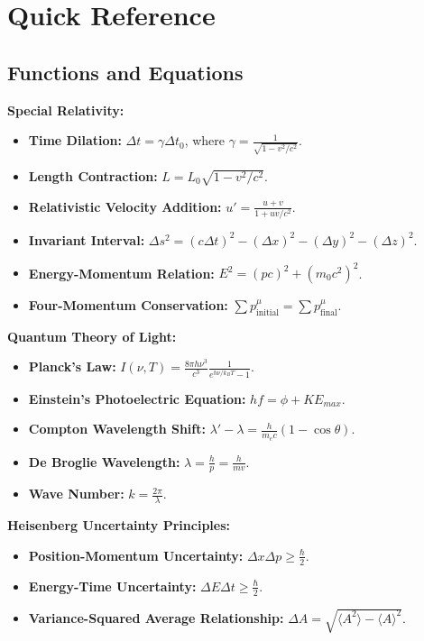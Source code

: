\documentclass{article}
\newcommand{\tipbox}[1]{\begin{tcolorbox}[colback=green!10] #1 \end{tcolorbox}}
\begin{document}
\newpage

\section{Quick Reference}

\subsection{Functions and Equations}
\begin{itemize}
    \tipbox{
    \textbf{Special Relativity:}
    \begin{itemize}
        \item \textbf{Time Dilation:} \(\Delta t = \gamma \Delta t_0\), where \(\gamma = \frac{1}{\sqrt{1 - v^2/c^2}}\).
        \item \textbf{Length Contraction:} \(L = L_0 \sqrt{1 - v^2/c^2}\).
        \item \textbf{Relativistic Velocity Addition:} \(u' = \frac{u + v}{1 + uv/c^2}\).
        \item \textbf{Invariant Interval:} \(\Delta s^2 = (c\Delta t)^2 - (\Delta x)^2 - (\Delta y)^2 - (\Delta z)^2\).
        \item \textbf{Energy-Momentum Relation:} \(E^2 = (pc)^2 + (m_0c^2)^2\).
        \item \textbf{Four-Momentum Conservation:} \(\sum p^\mu_{\text{initial}} = \sum p^\mu_{\text{final}}\).
    \end{itemize}
    }
    
    \tipbox{
    \textbf{Quantum Theory of Light:}
    \begin{itemize}
        \item \textbf{Planck's Law:} \(I(\nu, T) = \frac{8\pi h\nu^3}{c^3}\frac{1}{e^{h\nu/k_BT} - 1}\).
        \item \textbf{Einstein's Photoelectric Equation:} \(hf = \phi + KE_{max}\).
        \item \textbf{Compton Wavelength Shift:} \(\lambda' - \lambda = \frac{h}{m_ec}(1 - \cos\theta)\).
        \item \textbf{De Broglie Wavelength:} \(\lambda = \frac{h}{p} = \frac{h}{mv}\).
        \item \textbf{Wave Number:} \(k = \frac{2\pi}{\lambda}\).
    \end{itemize}
    }
    
    \tipbox{
    \textbf{Heisenberg Uncertainty Principles:}
    \begin{itemize}
        \item \textbf{Position-Momentum Uncertainty:} \(\Delta x \Delta p \geq \frac{\hbar}{2}\).
        \item \textbf{Energy-Time Uncertainty:} \(\Delta E \Delta t \geq \frac{\hbar}{2}\).
        \item \textbf{Variance-Squared Average Relationship:} \(\Delta A = \sqrt{\langle A^2 \rangle - \langle A \rangle^2}\).
    \end{itemize}
    }
    

\end{itemize}
\end{document}
